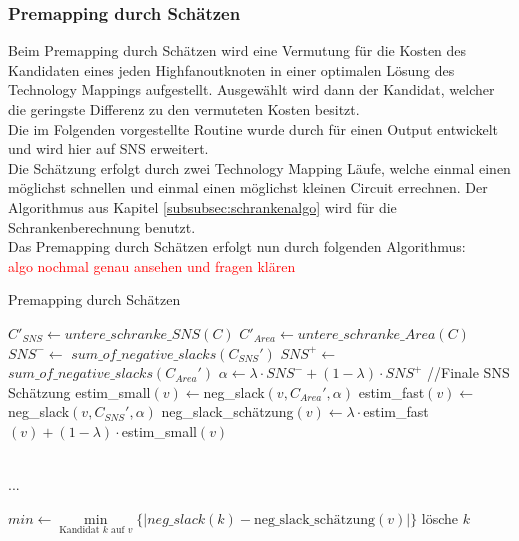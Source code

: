 \documentclass[11pt, a4paper, german]{article}
\newcommand{\TM}{Technology  Mapping }
\begin{document}
\subsubsection{Premapping durch Schätzen}
\label{subsec:premapping_duch_schaetzen}
Beim Premapping durch Schätzen wird eine Vermutung für die Kosten des Kandidaten eines jeden Highfanoutknoten in einer optimalen Lösung des Technology Mappings aufgestellt. Ausgewählt wird dann der Kandidat, welcher die geringste Differenz zu den vermuteten Kosten besitzt.\\
Die im Folgenden vorgestellte Routine wurde durch \cite{Elbert} für einen Output entwickelt und wird hier auf SNS erweitert.\\
Die Schätzung erfolgt durch zwei \TM Läufe, welche einmal einen möglichst schnellen und einmal einen möglichst kleinen Circuit errechnen. Der Algorithmus aus Kapitel \ref{subsubsec:schrankenalgo} wird für die Schrankenberechnung benutzt.\\

 Das Premapping durch Schätzen erfolgt nun durch folgenden Algorithmus:\\
\textcolor{red}{algo nochmal genau ansehen und fragen klären} 
 
\begin{algorithm}[H]
 \LinesNumbered
 \DontPrintSemicolon
 \caption{Premapping durch Schätzen}
 $C'_{SNS} \gets untere\_schranke\_SNS(C)$\;
$C'_{Area} \gets untere\_schranke\_Area(C)$\; 
 $SNS^- \gets $ $sum\_of\_negative\_slacks(C_{SNS}')$\;
 $SNS^+ \gets $ $sum\_of\_negative\_slacks(C_{Area}')$\;
 $\alpha \gets \lambda \cdot SNS^- + (1-\lambda)\cdot SNS^+$ //Finale SNS Sch\"atzung \;
 {
  estim\_small$(v) \gets $neg\_slack$(v,C_{Area}',\alpha)$\;
  estim\_fast$(v) \gets $neg\_slack$(v,C_{SNS}',\alpha)$\;
  neg\_slack\_sch\"atzung$(v) \gets \lambda \cdot $estim\_fast$(v) + (1-\lambda)\cdot$estim\_small$(v)$\;
 }
 
\ \\...\\ \;
 
  {
    $min \gets \min\limits_{\text{Kandidat }k\text{ auf }v}\{|neg\_slack(k)-\text{neg\_slack\_sch\"atzung}(v)|\}$\;
    {
      {
	l\"osche $k$\;
      }
    }
   }
\end{algorithm}\ \\
 
\end{document}
